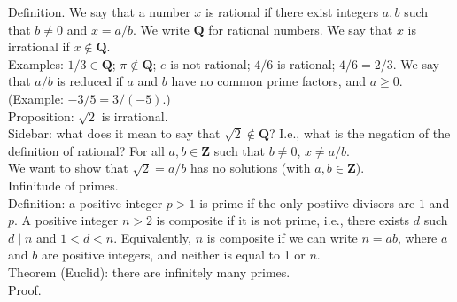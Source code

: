 \documentclass[12pt]{article}
\begin{document}
Definition. We say that a number $x$ is rational if there exist integers $a,b$ such that $b \neq 0$ and $x = a/b$. We write $\mathbf{Q}$ for rational numbers. We say that $x$ is irrational if $x \not \in \mathbf{Q}$.
\\

Examples: $1/3 \in \mathbf{Q}$; $\pi \not \in \mathbf{Q}$; $e$ is not rational; $4/6$ is rational; $4/6 = 2/3$. We say that $a/b$ is reduced if $a$ and $b$ have no common prime factors, and $a \geq 0$. (Example: $-3/5 = 3/(-5)$.) 
\\ 

Proposition: $\sqrt{2}$ is irrational.
\\

Sidebar: what does it mean to say that $\sqrt{2} \not \in \mathbf{Q}$? I.e., what is the negation of the definition of rational? For all $a,b \in \mathbf{Z}$ such that $b \neq 0$, $x \neq a/b$.
\\

We want to show that $\sqrt{2} = a/b$ has no solutions (with $a,b \in \mathbf{Z}$).
\\

Infinitude of primes. 
\\

Definition: a positive integer $p> 1$ is prime if the only postiive divisors are $1$ and $p$. A positive integer $n > 2$ is composite if it is not prime, i.e., there exists $d$ such $d \mid n$ and $1 < d < n$. Equivalently, $n$ is composite if we can write $n = ab$, where $a$ and $b$ are positive integers, and neither is equal to 1 or $n$.
\\

Theorem (Euclid): there are infinitely many primes. 
\\

Proof. 
\end{document}
